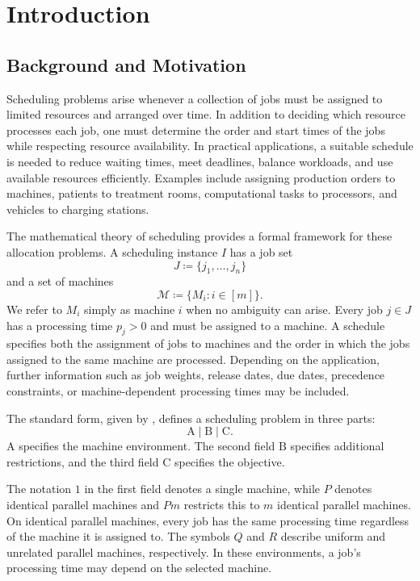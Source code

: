 \documentclass[%
english, titlepage=false %
]{./tum-templates/book/tumbook}
\begin{document}
\mainmatter{}
\chapter{Introduction}\label{chap:introduction}


\section{Background and Motivation}

Scheduling problems arise whenever a collection of jobs must be
assigned to limited resources and arranged over time. In addition to
deciding which resource processes each job, one must determine the
order and start times of the jobs while respecting resource
availability. In practical applications, a suitable schedule is needed to
reduce waiting times, meet deadlines, balance workloads, and use
available resources efficiently. Examples include assigning production
orders to machines, patients to treatment rooms, computational tasks to
processors, and vehicles to charging stations.

The mathematical theory of scheduling provides a formal framework for
these allocation problems. A scheduling instance \(I\) has a job set
\[
    J\coloneqq\{j_{1},\ldots,j_{n}\}
\]
and a set of machines
\[
    \mathcal{M}\coloneqq\{M_i:i\in[m]\}.
\]
We refer to \(M_i\) simply as machine \(i\) when no ambiguity can arise.
Every job \(j\in J\) has a processing time \(p_j>0\) and must be assigned
to a machine. A schedule specifies both the assignment of jobs to
machines and the order in which the jobs assigned to the same machine
are processed. Depending on the application, further information such
as job weights, release dates, due dates, precedence constraints, or
machine-dependent processing times may be included.

The standard form, 
given by \cite{GrahamEtAl1979}, defines a scheduling problem in three parts:
\[
    \mathrm{A}\mid\mathrm{B}\mid\mathrm{C}.
\]
\(\mathrm{A}\) specifies the machine environment. The
second field \(\mathrm{B}\) specifies additional restrictions, and the
third field \(\mathrm{C}\) specifies the objective.


The notation \(1\) in the first field denotes a single machine, while
\(P\) denotes identical parallel machines and $Pm$ restricts this to $m$ identical 
parallel machines. On identical parallel
machines, every job has the same processing time regardless of the
machine it is assigned to. The symbols \(Q\) and \(R\) describe
uniform and unrelated parallel machines, respectively. In these
environments, a job's processing time may depend on the selected
machine.
\end{document}
